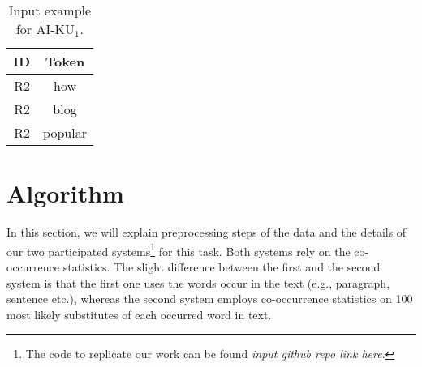 \documentclass[11pt]{article}
\begin{document}



\begin{table}
\begin{center}
\begin{tabular}{|r|c|}
\hline \bf ID & \bf Token \\ \hline
R2 & how \\
R2 & blog \\
R2 & popular \\
\hline
\end{tabular}
\end{center}
\caption{\label{tab:system1_input} Input example for AI-KU$_1$.}
\end{table}


\begin{table*}
\caption{Contexts when using a bigram language model}
\label{tab:subs_exp}
\end{table*}

\section{Algorithm}
\label{algorithm}
In this section, we will explain preprocessing steps of the data and the details of our two participated systems\footnote{The code to replicate our work can be found \emph{input github repo link here}.} for this task. Both systems rely on the co-occurrence statistics. The slight difference between the first and the second system is that the first one uses the words occur in the text (e.g., paragraph, sentence etc.), whereas the second system employs co-occurrence statistics on 100 most likely substitutes of each occurred word in text. 
\end{document}
